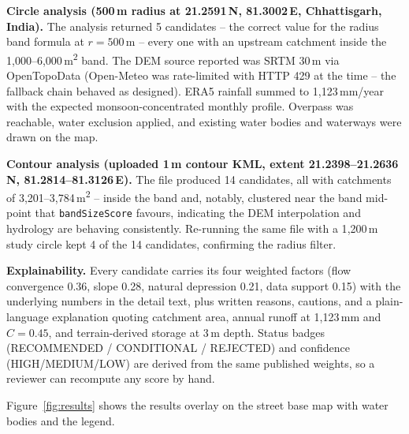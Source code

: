 \documentclass[manuscript,screen,review]{acmart}
\begin{document}
\textbf{Circle analysis (500\,m radius at 21.2591\,N, 81.3002\,E, Chhattisgarh, India).}
The analysis returned 5 candidates -- the correct value for the radius band
formula at $r = 500$\,m -- every one with an upstream catchment inside the
1{,}000--6{,}000\,m\textsuperscript{2} band. The DEM source reported was
SRTM 30\,m via OpenTopoData (Open-Meteo was rate-limited with HTTP 429 at
the time -- the fallback chain behaved as designed). ERA5 rainfall
summed to 1{,}123\,mm/year with the expected monsoon-concentrated monthly
profile. Overpass was reachable, water exclusion applied, and existing water
bodies and waterways were drawn on the map.

\textbf{Contour analysis (uploaded 1\,m contour KML, extent
21.2398--21.2636\,N, 81.2814--81.3126\,E).} The file produced 14 candidates,
all with catchments of 3{,}201--3{,}784\,m\textsuperscript{2} -- inside the
band and, notably, clustered near the band mid-point that
\texttt{bandSizeScore} favours, indicating the DEM interpolation and hydrology
are behaving consistently. Re-running the same file with a 1{,}200\,m study
circle kept 4 of the 14 candidates, confirming the radius filter.

\textbf{Explainability.} Every candidate carries its four weighted factors
(flow convergence 0.36, slope 0.28, natural depression 0.21, data support
0.15) with the underlying numbers in the detail text, plus written reasons,
cautions, and a plain-language explanation quoting catchment area, annual
runoff at 1{,}123\,mm and $C = 0.45$, and terrain-derived storage at 3\,m
depth. Status badges (RECOMMENDED / CONDITIONAL / REJECTED) and confidence
(HIGH/MEDIUM/LOW) are derived from the same published weights, so a reviewer
can recompute any score by hand.

Figure~\ref{fig:results} shows the results overlay on the street base map
with water bodies and the legend.
\end{document}
